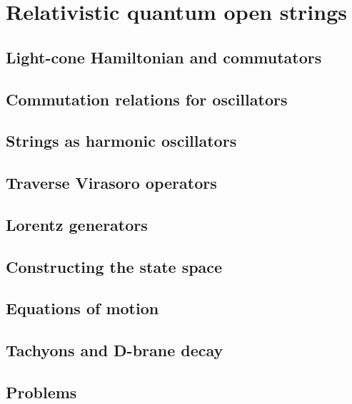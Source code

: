 \documentclass[12pt]{report}
\begin{document}
\chapter{Relativistic quantum open strings}
\newpage
\section{Light-cone Hamiltonian and commutators}
\section{Commutation relations for oscillators}
\section{Strings as harmonic oscillators}
\section{Traverse Virasoro operators}
\section{Lorentz generators}
\section{Constructing the state space}
\section{Equations of motion}
\section{Tachyons and D-brane decay}
\section{Problems}
\end{document}
